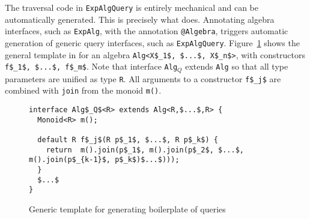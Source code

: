 
The traversal code in \lstinline{ExpAlgQuery} is entirely
mechanical and can be automatically generated.  This is precisely what
\name does. Annotating algebra interfaces, such as \lstinline{ExpAlg}, with the annotation \lstinline{@Algebra},
triggers automatic generation of generic query interfaces, such as \lstinline{ExpAlgQuery}. 
Figure~\ref{queryTemplate} shows the general template in \name for an algebra \lstinline[mathescape=true]{Alg<X$_1$, $...$, X$_n$>}, with constructors \lstinline[mathescape=true]{f$_1$, $...$, f$_m$}.
Note that interface \lstinline{Alg}$_Q$ extends \lstinline{Alg} so that all type parameters are unified as type \lstinline{R}.
All arguments to a constructor \lstinline[mathescape=true]{f$_j$} are combined with \lstinline{join} from the monoid \lstinline{m()}.

\begin{figure}[t]
\begin{lstlisting}[mathescape=true]
interface Alg$_Q$<R> extends Alg<R,$...$,R> {
  Monoid<R> m();

  default R f$_j$(R p$_1$, $...$, R p$_k$) {
    return  m().join(p$_1$, m().join(p$_2$, $...$, m().join(p$_{k-1}$, p$_k$)$...$)));
  }
  $...$
}
\end{lstlisting}
\caption{Generic template for generating boilerplate of queries}
\label{queryTemplate}
\end{figure}

